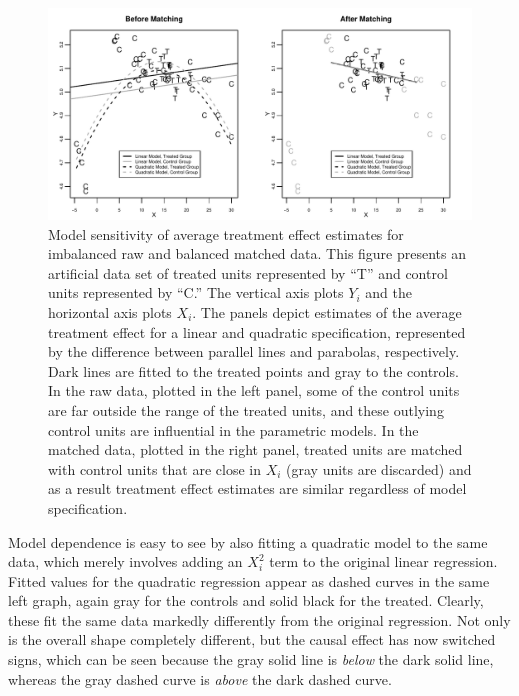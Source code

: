 \documentclass[11pt,titlepage]{article}
\begin{document}
\begin{figure}[t] 
 \begin{center}
   \includegraphics[width=6in]{figs/olspanel-sept06.pdf}
  \end{center}
  \vspace{-0.275in}
  \caption{Model sensitivity of average treatment effect estimates for
    imbalanced raw and balanced matched data.  This figure presents an
    artificial data set of treated units represented by ``T'' and
    control units represented by ``C.'' The vertical axis plots $Y_i$
    and the horizontal axis plots $X_i$.  The panels depict estimates
    of the average treatment effect for a linear and quadratic
    specification, represented by the difference between parallel
    lines and parabolas, respectively.  Dark lines are fitted to the
    treated points and gray to the controls.  In the raw data, plotted
    in the left panel, some of the control units are far outside the
    range of the treated units, and these outlying control units are
    influential in the parametric models.  In the matched data,
    plotted in the right panel, treated units are matched with control
    units that are close in $X_i$ (gray units are discarded) and as a
    result treatment effect estimates are similar regardless of model
    specification.}
  \label{fg:extrap}
\end{figure}

Model dependence is easy to see by also fitting a quadratic model to
the same data, which merely involves adding an $X_i^2$ term to the
original linear regression.  Fitted values for the quadratic
regression appear as dashed curves in the same left graph, again gray
for the controls and solid black for the treated.  Clearly, these fit
the same data markedly differently from the original regression.  Not
only is the overall shape completely different, but the causal effect
has now switched signs, which can be seen because the gray solid line
is \emph{below} the dark solid line, whereas the gray dashed curve is
\emph{above} the dark dashed curve.
\end{document}

